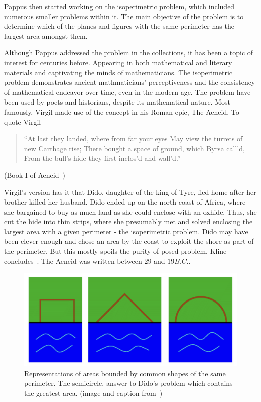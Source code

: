 \documentclass[a4paper]{book}
\numberwithin{theorem}{section}%
\begin{document}
Pappus then started working on the isoperimetric problem, which included numerous smaller problems within it. The main objective of the problem is to determine which of the planes and figures with the same perimeter has the largest area amongst them.

Although Pappus addressed the problem in the collections, it has been a topic of interest for centuries before. Appearing in both mathematical and literary materials and captivating the minds of mathematicians. 
\newline
\newline
The isoperimetric problem demonstrates ancient mathmaticians' perceptiveness and the consistency of mathematical endeavor over time, even in the modern age. The problem have been used by poets and historians, despite its mathematical nature. Most famously, Virgil made use of the concept in his Roman epic, The Aeneid. To quote Virgil
\begin{center}
    \begin{quote}
        ``At last they landed, where from far your eyes
        May view the turrets of new Carthage rise;
        There bought a space of ground, which Byrsa call'd,
        From the bull's hide they first inclos'd and wall'd.''
    \end{quote}
    (Book I of Aeneid~\citep{virgil1981aeneid})
\end{center}

Virgil's version has it that Dido, daughter of the king of Tyre, fled home after her brother killed her husband. Dido ended up on the north coast of Africa, where she bargained to buy as much land as she could enclose with an oxhide. Thus, she cut the hide into thin strips, where she presumably met and solved enclosing the largest area with a given perimeter - the isoperimetric problem. Dido may have been clever enough and chose an area by the coast to exploit the shore as part of the perimeter. But this mostly spoils the purity of posed problem. Kline concludes~\citep{kline1985mathematics}. The Aeneid was written between $29$ and $19 B.C.$.
\begin{figure}[h]
    \begin{center}   
        \includegraphics[width=120mm]{dido_1}
        \caption{Representations of areas bounded by common shapes of the same perimeter. The semicircle, answer to Dido's problem which contains the greatest area. (image and caption from~\citep{demjanenko2008isoperimetric})}
    \end{center}
\end{figure}
\leavevmode
\end{document}
